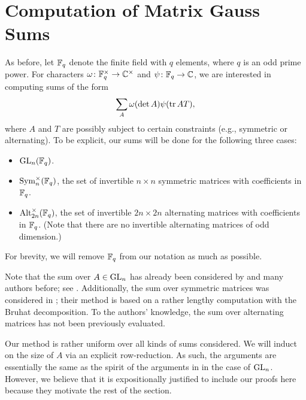 
\section{Computation of Matrix Gauss Sums} \label{sec:gsum}
As before, let $\mathbb F_q$ denote the finite field with $q$ elements, where $q$ is an odd prime power. For characters $\omega\colon\mathbb F_q^\times\to\mathbb C^\times$ and $\psi\colon\mathbb F_q\to\mathbb C$, we are interested in computing sums of the form
\[\sum_A\omega(\det A)\psi(\operatorname{tr} AT),\]
where $A$ and $T$ are possibly subject to certain constraints (e.g., symmetric or alternating). To be explicit, our sums will be done for the following three cases:
\begin{itemize}
    \item $\mathrm{GL}_n(\mathbb F_q)$.
    \item $\operatorname{Sym}_n^\times(\mathbb F_q)$, the set of invertible $n\times n$ symmetric matrices with coefficients in $\mathbb F_q$.
    \item $\operatorname{Alt}_{2n}^\times(\mathbb F_q)$, the set of invertible $2n\times 2n$ alternating matrices with coefficients in $\mathbb F_q$. (Note that there are no invertible alternating matrices of odd dimension.)
\end{itemize}
For brevity, we will remove $\mathbb F_q$ from our notation as much as possible.

Note that the sum over $A\in\mathrm{GL}_n$ has already been considered by \cite{kim-gauss-sum} and many authors before; see \cite[Section 1]{kim-gauss-sum}. Additionally, the sum over symmetric matrices was considered in \cite{saito-sym-gauss-sum}; their method is based on a rather lengthy computation with the Bruhat decomposition. To the authors' knowledge, the sum over alternating matrices has not been previously evaluated.

Our method is rather uniform over all kinds of sums considered. We will induct on the size of $A$ via an explicit row-reduction. As such, the arguments are essentially the same as the spirit of the arguments in \cite{kim-gauss-sum} in the case of $\mathrm{GL}_n$. However, we believe that it is expositionally justified to include our proofs here because they motivate the rest of the section.

